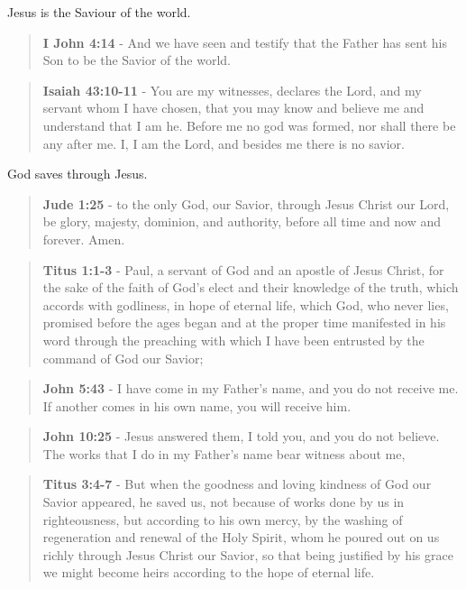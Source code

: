 \documentclass[11pt]{article}
\begin{document}
Jesus is the Saviour of the world.

\begin{quote}
\textbf{I John 4:14} - And we have seen and testify that the Father has sent his Son to be the Savior of the world.
\end{quote}

\begin{quote}
\textbf{Isaiah 43:10-11} - You are my witnesses, declares the Lord, and my servant whom I have chosen, that you may know and believe me and understand that I am he. Before me no god was formed, nor shall there be any after me. I, I am the Lord, and besides me there is no savior.
\end{quote}

God saves through Jesus. 

\begin{quote}
\textbf{Jude 1:25} - to the only God, our Savior, through Jesus Christ our Lord, be glory, majesty, dominion, and authority, before all time and now and forever. Amen.
\end{quote}

\begin{quote}
\textbf{Titus 1:1-3} - Paul, a servant of God and an apostle of Jesus Christ, for the sake of the faith of God's elect and their knowledge of the truth, which accords with godliness, in hope of eternal life, which God, who never lies, promised before the ages began and at the proper time manifested in his word through the preaching with which I have been entrusted by the command of God our Savior;
\end{quote}

\begin{quote}
\textbf{John 5:43} - I have come in my Father's name, and you do not receive me. If another comes in his own name, you will receive him.
\end{quote}

\begin{quote}
\textbf{John 10:25} - Jesus answered them, I told you, and you do not believe. The works that I do in my Father's name bear witness about me,
\end{quote}

\begin{quote}
\textbf{Titus 3:4-7} - But when the goodness and loving kindness of God our Savior appeared, he saved us, not because of works done by us in righteousness, but according to his own mercy, by the washing of regeneration and renewal of the Holy Spirit, whom he poured out on us richly through Jesus Christ our Savior, so that being justified by his grace we might become heirs according to the hope of eternal life.
\end{quote}
\end{document}

